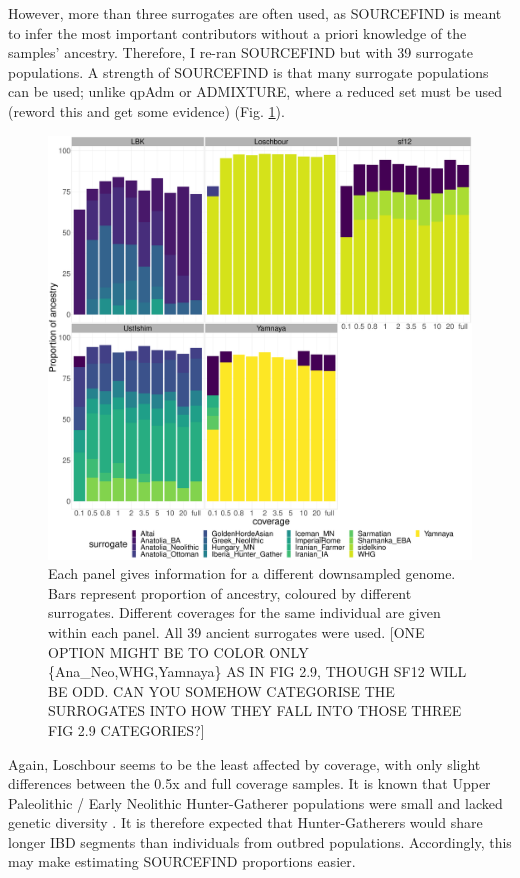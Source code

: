 However, more than three surrogates are often used, as SOURCEFIND is meant to infer the most important contributors without a priori knowledge of the samples' ancestry. Therefore, I re-ran SOURCEFIND but with 39 surrogate populations. A strength of SOURCEFIND is that many surrogate populations can be used; unlike qpAdm or ADMIXTURE, where a reduced set must be used (reword this and get some evidence) (Fig. \ref{fig:SOURCEFIND_AllPSop_downsampled}). 

\begin{figure}[htp]
    \centering
    \includegraphics[width=1.0\textwidth]{../images/chapter1/Allpops_SF_downsampled.pdf}
    \caption{Each panel gives information for a different downsampled genome. Bars represent proportion of ancestry, coloured by different surrogates. Different coverages for the same individual are given within each panel. All 39 ancient surrogates were used. {\color{red}[ONE OPTION MIGHT BE TO COLOR ONLY \{Ana\_Neo,WHG,Yamnaya\} AS IN FIG 2.9, THOUGH SF12 WILL BE ODD. CAN YOU SOMEHOW CATEGORISE THE SURROGATES INTO HOW THEY FALL INTO THOSE THREE FIG 2.9 CATEGORIES?]}}
    \label{fig:SOURCEFIND_AllPSop_downsampled}
\end{figure}

Again, Loschbour seems to be the least affected by coverage, with only slight differences between the 0.5x and full coverage samples. It is known that Upper Paleolithic / Early Neolithic Hunter-Gatherer populations were small and lacked genetic diversity \cite{excoffier1999hunter, Lazaridis2014, Fu2016}. It is therefore expected that Hunter-Gatherers would share longer IBD segments than individuals from outbred populations. Accordingly, this may make estimating SOURCEFIND proportions easier.


